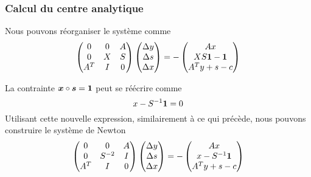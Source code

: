 \documentclass[usepdftitle=false, aspectratio=169]{beamer}
\begin{document}
\begin{frame}
\frametitle{Calcul du centre analytique}

Nous pouvons réorganiser le système comme
$$
\begin{pmatrix}
	0 & 0 & A \\
	0 & X & S \\
	A^T & I & 0 \\
\end{pmatrix}
\begin{pmatrix}
	\Delta y \\ \Delta s \\ \Delta x
\end{pmatrix}
=
-
\begin{pmatrix}
	Ax \\ XS{\boldsymbol{1}} - {\boldsymbol{1}} \\ A^Ty+s-c
\end{pmatrix}
$$

\mbox {}

La contrainte ${\boldsymbol{x}} \circ {\boldsymbol{s}} = {\boldsymbol{1}}$ peut se réécrire comme
$$
x-S^{-1}{\boldsymbol{1}} = 0
$$
Utilisant cette nouvelle expression, similairement à ce qui précède, nous pouvons construire le système de Newton
$$
\begin{pmatrix}
	0 & 0 & A \\
	0 & S^{-2} & I \\
	A^T & I & 0 \\
\end{pmatrix}
\begin{pmatrix}
	\Delta y \\ \Delta s \\ \Delta x
\end{pmatrix}
=
-
\begin{pmatrix}
	Ax \\ x-S^{-1}{\boldsymbol{1}} \\ A^Ty+s-c
\end{pmatrix}
$$

\end{frame}
\end{document}
